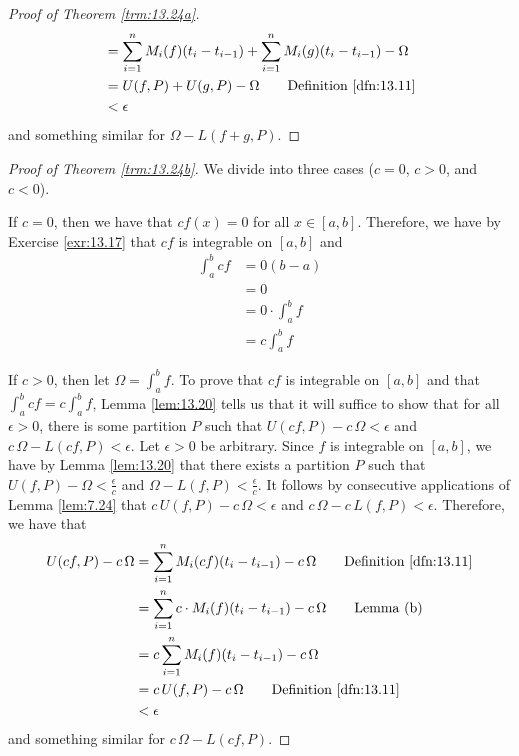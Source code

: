 \documentclass[../main.tex]{subfiles}
\begin{document}
\begin{theorem}
\begin{proof}[Proof of Theorem \ref{trm:13.24a}]
\begin{align*}
            &= \sum_{i=1}^nM_i(f)(t_i-t_{i-1})+\sum_{i=1}^nM_i(g)(t_i-t_{i-1})-\Omega\\
            &= U(f,P)+U(g,P)-\Omega\tag*{Definition \ref{dfn:13.11}}\\
            &< \epsilon
        \end{align*}
        and something similar for $\Omega-L(f+g,P)$.
    \end{proof}
    \begin{proof}[Proof of Theorem \ref{trm:13.24b}]
        We divide into three cases ($c=0$, $c>0$, and $c<0$).\par
        If $c=0$, then we have that $cf(x)=0$ for all $x\in[a,b]$. Therefore, we have by Exercise \ref{exr:13.17} that $cf$ is integrable on $[a,b]$ and
        \begin{align*}
            \int_a^bcf &= 0(b-a)\\
            &= 0\\
            &= 0\cdot\int_a^bf\\
            &= c\int_a^bf
        \end{align*}\par
        If $c>0$, then let $\Omega=\int_a^bf$. To prove that $cf$ is integrable on $[a,b]$ and that $\int_a^bcf=c\int_a^bf$, Lemma \ref{lem:13.20} tells us that it will suffice to show that for all $\epsilon>0$, there is some partition $P$ such that $U(cf,P)-c\,\Omega<\epsilon$ and $c\,\Omega-L(cf,P)<\epsilon$. Let $\epsilon>0$ be arbitrary. Since $f$ is integrable on $[a,b]$, we have by Lemma \ref{lem:13.20} that there exists a partition $P$ such that $U(f,P)-\Omega<\frac{\epsilon}{c}$ and $\Omega-L(f,P)<\frac{\epsilon}{c}$. It follows by consecutive applications of Lemma \ref{lem:7.24} that $c\, U(f,P)-c\,\Omega<\epsilon$ and $c\,\Omega-c\, L(f,P)<\epsilon$. Therefore, we have that
        \begin{align*}
            U(cf,P)-c\,\Omega &= \sum_{i=1}^nM_i(cf)(t_i-t_{i-1})-c\,\Omega\tag*{Definition \ref{dfn:13.11}}\\
            &= \sum_{i=1}^nc\cdot M_i(f)(t_i-t_{i-1})-c\,\Omega\tag*{Lemma (b)}\\
            &= c\sum_{i=1}^nM_i(f)(t_i-t_{i-1})-c\,\Omega\\
            &= c\, U(f,P)-c\,\Omega\tag*{Definition \ref{dfn:13.11}}\\
            &< \epsilon
        \end{align*}
        and something similar for $c\,\Omega-L(cf,P)$.\par

\end{proof}
\end{theorem}
\end{document}
